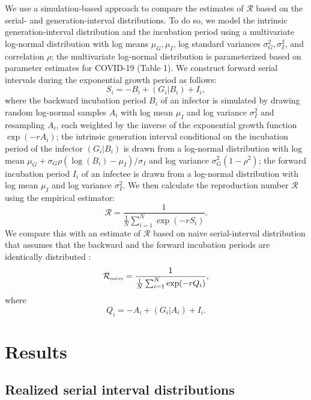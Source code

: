 \documentclass[12pt]{article}
\begin{document}
We use a simulation-based approach to compare the estimates of $\mathcal R$ based on the serial- and generation-interval distributions. 
To do so, we model the intrinsic generation-interval distribution and the incubation period using a multivariate log-normal distribution with log means $\mu_G, \mu_I$, log standard variances $\sigma_G^2, \sigma_I^2$, and correlation $\rho$;
the multivariate log-normal distribution is parameterized based on parameter estimates for COVID-19 (Table 1).
We construct forward serial intervals during the exponential growth period as follows:
\begin{equation}
S_i = -B_i + (G_i|B_i) + I_i,
\end{equation}
where the backward incubation period $B_i$ of an infector is simulated by drawing random log-normal samples $A_i$ with log mean $\mu_I$ and log variance $\sigma_I^2$ and resampling $A_i$, each weighted by the inverse of the exponential growth function $\exp(-rA_i)$;
the intrinsic generation interval conditional on the incubation period of the infector $(G_i|B_i)$ is drawn from a log-normal distribution with log mean $\mu_G + \sigma_G \rho (\log(B_i) - \mu_I)/\sigma_I$ and log variance $\sigma_G^2 (1-\rho^2)$;
the forward incubation period $I_i$ of an infectee is drawn from a log-normal distribution with log mean $\mu_I$ and log variance $\sigma_I^2$.
We then calculate the reproduction number $\mathcal R$ using the empirical estimator:
\begin{equation}
\mathcal R = \frac{1}{\frac{1}{N}\sum_{i=1}^N \exp(- r S_i)}.
\end{equation}
We compare this with an estimate of $\mathcal R$ based on naive serial-interval distribution that assumes that the backward and the forward incubation periods are identically distributed \citep{svensson2007note,klinkenberg2011correlation,champredon2018equivalence, britton2019estimation}:
\begin{equation}
{\mathcal R}_{\textrm{\tiny naive}} = \frac{1}{\frac{1}{N}\sum_{i=1}^N \exp(- r Q_i)},
\end{equation}
where
\begin{equation}
Q_i = -A_i + (G_i|A_i) + I_i.
\end{equation}

\section{Results}

\subsection{Realized serial interval distributions}
\end{document}
